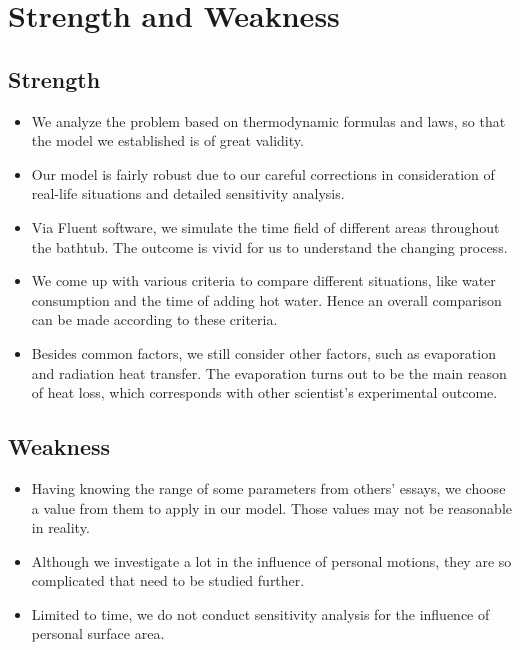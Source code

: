 \documentclass{mcmthesis}
\begin{document}
\section{Strength and Weakness}

\subsection{Strength}

\begin{itemize}
\item We analyze the problem based on thermodynamic formulas and laws, so that the model we established is of great validity.

\item Our model is fairly robust due to our careful corrections in consideration of real-life situations and detailed sensitivity analysis.

\item Via Fluent software, we simulate the time field of different areas throughout the bathtub. The outcome is vivid for us to understand the changing process.

\item We come up with various criteria to compare different situations, like water consumption and the time of adding hot water. Hence an overall comparison can be made according to these criteria.

\item Besides common factors, we still consider other factors, such as evaporation and radiation heat transfer. The evaporation turns out to be the main reason of heat loss, which corresponds with other scientist’s experimental outcome.
\end{itemize}

\subsection{Weakness}

\begin{itemize}
\item Having knowing the range of some parameters from others’ essays, we choose a value from them to apply in our model. Those values may not be reasonable in reality.

\item Although we investigate a lot in the influence of personal motions, they are so complicated that need to be studied further.

\item Limited to time, we do not conduct sensitivity analysis for the influence of personal surface area.
\end{itemize}
\end{document}

